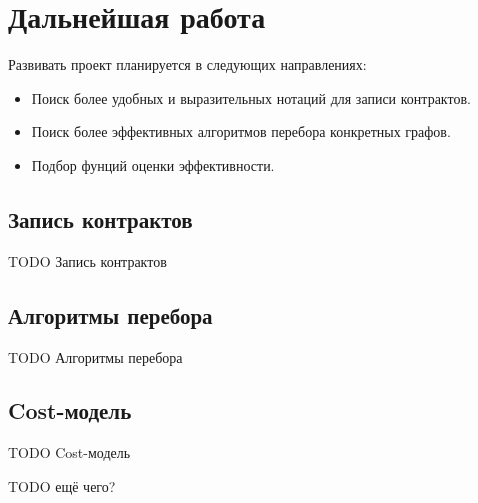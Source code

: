 \section{Дальнейшая работа}

Развивать проект планируется в следующих направлениях:
\begin{itemize}
    \item Поиск более удобных и выразительных нотаций для записи контрактов.
    \item Поиск более эффективных алгоритмов перебора конкретных графов.
    \item Подбор фунций оценки эффективности.
\end{itemize}

\subsection{Запись контрактов}

TODO Запись контрактов

\subsection{Алгоритмы перебора}

TODO Алгоритмы перебора

\subsection{Cost-модель}

TODO Cost-модель

TODO ещё чего?
